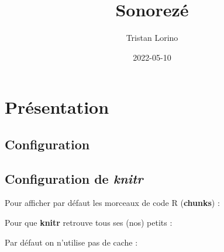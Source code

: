 \documentclass[
]{book}
\title{Sonorezé}
\author{Tristan Lorino}
\date{2022-05-10}
\newenvironment{Shaded}{\begin{snugshade}}{\end{snugshade}}
\newcommand{\AttributeTok}[1]{\textcolor[rgb]{0.77,0.63,0.00}{#1}}
\newcommand{\ConstantTok}[1]{\textcolor[rgb]{0.00,0.00,0.00}{#1}}
\newcommand{\FunctionTok}[1]{\textcolor[rgb]{0.00,0.00,0.00}{#1}}
\newcommand{\NormalTok}[1]{#1}
\newcommand{\SpecialCharTok}[1]{\textcolor[rgb]{0.00,0.00,0.00}{#1}}
\begin{document}
\maketitle

{
\setcounter{tocdepth}{1}
\tableofcontents
}
\hypertarget{pruxe9sentation}{%
\chapter{Présentation}\label{pruxe9sentation}}

\hypertarget{configuration}{%
\section{Configuration}\label{configuration}}

\hypertarget{configuration-de-knitr}{%
\section{\texorpdfstring{Configuration de \emph{knitr}}{Configuration de knitr}}\label{configuration-de-knitr}}

Pour afficher par défaut les morceaux de code R (\textbf{chunks}) :

\begin{Shaded}
\end{Shaded}

Pour que \textbf{knitr} retrouve tous ses (nos) petits :

\begin{Shaded}
\end{Shaded}

Par défaut on n'utilise pas de cache :

\begin{Shaded}
\end{Shaded}
\end{document}
